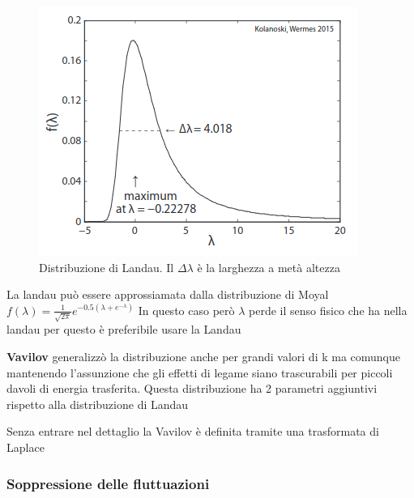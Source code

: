 \begin{minipage}{0.48\textwidth}
    \begin{figure}[H]
        \centering
        \includegraphics[width=\textwidth,frame]{Chapters/images/Interazione_radiazione_materia/image-20220216191943021.png}
        \captionsetup{width=\textwidth}
        \caption{Distribuzione di Landau. Il $\Delta \lambda$ è la larghezza a metà altezza}
        \label{fig:landau}
    \end{figure}
\end{minipage} \hspace{0.4cm}
\begin{minipage}{0.4\textwidth}
\begin{remark}
    La landau può essere approssiamata dalla distribuzione di Moyal $f(\lambda)=\frac{1}{\sqrt{2\pi}}e^{-0.5(\lambda+e^{-\lambda})}$ 
In questo caso però $\lambda$ perde il senso fisico che ha nella landau per questo è preferibile usare la Landau
\end{remark}
\textbf{Vavilov}  generalizzò la distribuzione anche per grandi valori di k ma comunque mantenendo l'assunzione che gli effetti di legame siano trascurabili per piccoli davoli di energia trasferita.
Questa distribuzione ha 2 parametri aggiuntivi rispetto alla distribuzione di Landau
\end{minipage}
\begin{details}
    Senza entrare nel dettaglio la Vavilov è definita tramite una trasformata di Laplace
\end{details}
\subsubsection*{Soppressione delle fluttuazioni}

